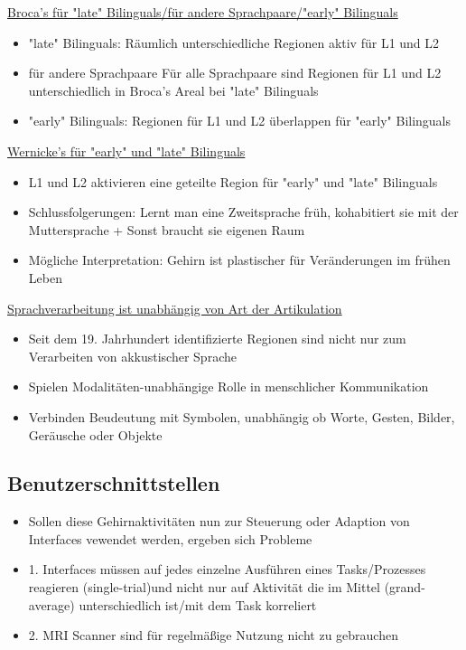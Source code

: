\documentclass[a4paper,10pt,oneside]{article}
\begin{document}
\underline{Broca's für "late" Bilinguals/für andere Sprachpaare/"early" Bilinguals} \\
 	\begin{itemize}
 		\item "late" Bilinguals: Räumlich unterschiedliche Regionen aktiv für L1 und L2
 		\item für andere Sprachpaare Für alle Sprachpaare sind Regionen für L1 und L2 unterschiedlich in Broca's Areal bei "late" Bilinguals 
 		\item "early" Bilinguals: Regionen für L1 und L2 überlappen für "early" Bilinguals
 	\end{itemize}
 	
\underline{Wernicke's für "early" und "late" Bilinguals} \\
	\begin{itemize}
		\item L1 und L2 aktivieren eine geteilte Region für "early" und "late" Bilinguals
		\item Schlussfolgerungen: Lernt man eine Zweitsprache früh, kohabitiert sie mit der Muttersprache + Sonst braucht sie eigenen Raum
		\item Mögliche Interpretation: Gehirn ist plastischer für Veränderungen im frühen Leben
	\end{itemize}
	
\underline{Sprachverarbeitung ist unabhängig von Art der Artikulation} \\
	\begin{itemize}
		\item Seit dem 19. Jahrhundert identifizierte Regionen sind nicht nur zum Verarbeiten von akkustischer Sprache
		\item Spielen Modalitäten-unabhängige Rolle in menschlicher Kommunikation
		\item Verbinden Beudeutung mit Symbolen, unabhängig ob Worte, Gesten, Bilder, Geräusche oder Objekte 
	\end{itemize}
	
\subsection{Benutzerschnittstellen}
	\begin{itemize}
		\item Sollen diese Gehirnaktivitäten nun zur Steuerung oder Adaption von Interfaces vewendet werden, ergeben sich Probleme
		\item 1. Interfaces müssen auf jedes einzelne Ausführen eines Tasks/Prozesses reagieren (single-trial)und nicht nur auf Aktivität die im Mittel (grand-average) unterschiedlich ist/mit dem Task korreliert
		\item 2. MRI Scanner sind für regelmäßige Nutzung nicht zu gebrauchen
	\end{itemize}
	
\end{document}
